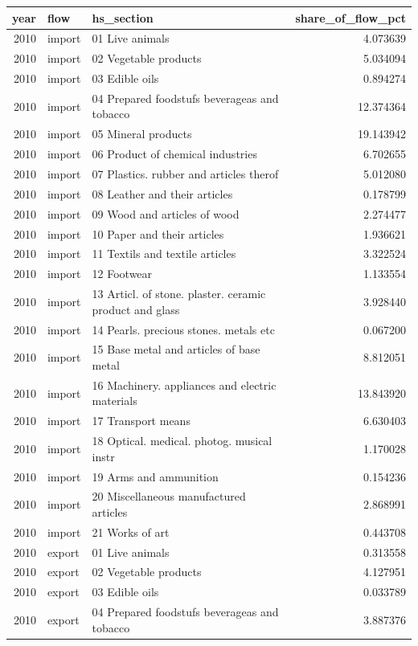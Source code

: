 \begin{tabular}{rllr}
\toprule
year & flow & hs_section & share_of_flow_pct \\
\midrule
2010 & import & 01 Live animals & 4.073639 \\
2010 & import & 02 Vegetable products & 5.034094 \\
2010 & import & 03 Edible oils & 0.894274 \\
2010 & import & 04 Prepared foodstufs beverageas and tobacco & 12.374364 \\
2010 & import & 05 Mineral products & 19.143942 \\
2010 & import & 06 Product of chemical industries & 6.702655 \\
2010 & import & 07 Plastics. rubber and articles therof & 5.012080 \\
2010 & import & 08 Leather and their articles & 0.178799 \\
2010 & import & 09 Wood and articles of wood & 2.274477 \\
2010 & import & 10 Paper and their articles & 1.936621 \\
2010 & import & 11 Textils and textile articles & 3.322524 \\
2010 & import & 12 Footwear & 1.133554 \\
2010 & import & 13 Articl. of stone. plaster. ceramic product and glass & 3.928440 \\
2010 & import & 14 Pearls. precious stones. metals etc & 0.067200 \\
2010 & import & 15 Base metal and articles of base metal & 8.812051 \\
2010 & import & 16 Machinery. appliances and electric materials & 13.843920 \\
2010 & import & 17 Transport means & 6.630403 \\
2010 & import & 18 Optical. medical. photog. musical instr & 1.170028 \\
2010 & import & 19 Arms and ammunition & 0.154236 \\
2010 & import & 20 Miscellaneous manufactured articles & 2.868991 \\
2010 & import & 21 Works of art & 0.443708 \\
2010 & export & 01 Live animals & 0.313558 \\
2010 & export & 02 Vegetable products & 4.127951 \\
2010 & export & 03 Edible oils & 0.033789 \\
2010 & export & 04 Prepared foodstufs beverageas and tobacco & 3.887376 \\

\end{tabular}
